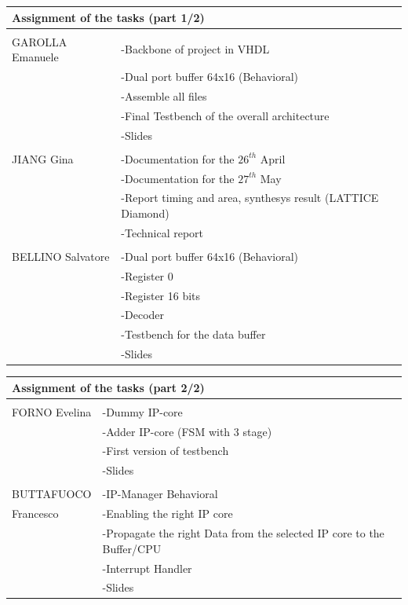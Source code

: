 \begin{table}
	\begin{tabular}{p{3.5cm}|  p{12.1cm}}
		\multicolumn{2}{p{15.0cm}}{ \LARGE{{Assignment of the tasks (part 1/2)}}}\\
		\hline \hline 
		\multicolumn{2}{p{1.0cm}}{ \Large{{}}}\\
		GAROLLA Emanuele& -Backbone of project in VHDL\\
		& -Dual port buffer 64x16 (Behavioral)\\
		&-Assemble all files\\	
	 &-Final Testbench of the overall architecture	 \\
		 & -Slides\\
		
		\multicolumn{2}{p{1.0cm}}{ \Large{{}}}\\
		JIANG Gina& -Documentation for the $ 26^{th} $ April\\
		&-Documentation for the $ 27^{th} $ May\\
		&-Report timing and area, synthesys result (LATTICE Diamond)\\
		&-Technical report\\
		\multicolumn{2}{p{1.0cm}}{ \Large{{ }}}\\
		
		BELLINO Salvatore& -Dual port buffer 64x16 (Behavioral)\\
		&\qquad -Register 0\\
		&\qquad -Register 16 bits\\
		&\qquad -Decoder\\
		&-Testbench for the data buffer\\
		&-Slides	
			
			\end{tabular}
		\end{table}	
		\begin{table}
			\begin{tabular}{p{3.5cm}|  p{12.1cm}}
					\multicolumn{2}{p{15.0cm}}{ \LARGE{{Assignment of the tasks (part 2/2)}}}\\
					\hline \hline\multicolumn{2}{p{1.0cm}}{ \Large{{ }}}\\	
		FORNO Evelina& -Dummy IP-core\\
		&-Adder IP-core (FSM with 3 stage)\\
		&-First version of testbench\\
		&-Slides\\
		\multicolumn{2}{p{1.0cm}}{ \Large{{ }}}\\
		BUTTAFUOCO & -IP-Manager Behavioral\\
		Francesco&\qquad-Enabling the right IP core\\
		&\qquad-Propagate the right Data from the selected IP core to the Buffer/CPU\\
		&\qquad-Interrupt Handler\\
		&-Slides\\	
	\end{tabular}
\end{table}
